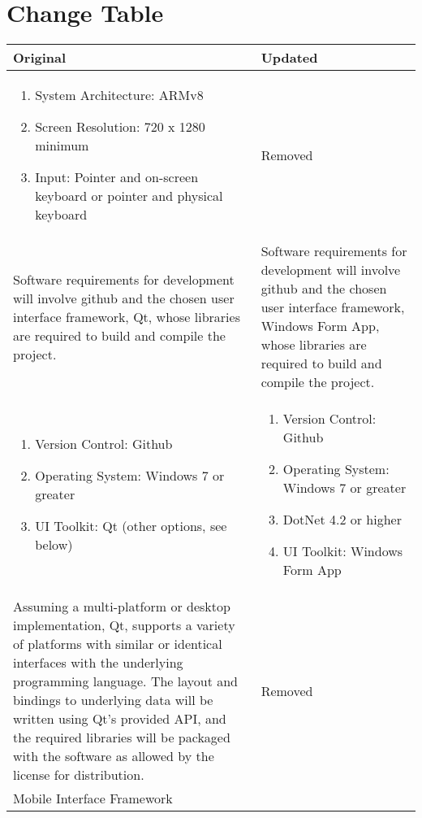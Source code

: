 \documentclass[onecolumn, draftclsnofoot,10pt, compsoc]{IEEEtran}
\begin{document}
\section{Change Table}
\begin{tabular}{| p{} | p{} |}
\hline
Original & Updated \\
\hline
\begin{enumerate}
    \item System Architecture: ARMv8
    \item Screen Resolution: 720 x 1280 minimum
    \item Input: Pointer and on-screen keyboard or pointer and physical keyboard
\end{enumerate}
& Removed\\
\hline
Software requirements for development will involve github and the chosen user interface framework, Qt, whose libraries are required to build and compile the project. & Software requirements for development will involve github and the chosen user interface framework, Windows Form App, whose libraries are required to build and compile the project.\\
\hline
\begin{enumerate}
    \item Version Control: Github
     \item Operating System: Windows 7 or greater
    \item UI Toolkit: Qt (other options, see below)
 \end{enumerate}
& 
\begin{enumerate}
    \item Version Control: Github
     \item Operating System: Windows 7 or greater
    \item DotNet 4.2 or higher
    \item UI Toolkit: Windows Form App
 \end{enumerate}\\
\hline
Assuming a multi-platform or desktop implementation, Qt, supports a variety of platforms with similar or identical interfaces with the underlying programming language.
The layout and bindings to underlying data will be written using Qt's provided API, and the required libraries will be packaged with the software as allowed by the license for distribution. 
& 
Removed \\
\hline
Mobile Interface Framework
\newline
\newline

\end{tabular}
\end{document}
